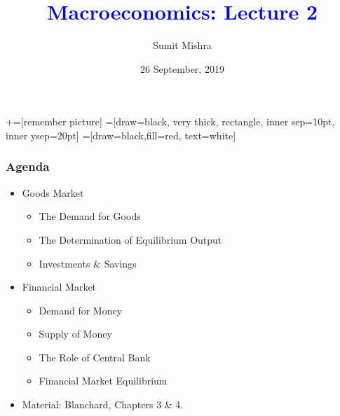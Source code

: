 \documentclass[shownotes,11pt, aspectratio=169]{beamer}
\title[]{\textcolor{blue}{Macroeconomics: Lecture 2}}
\author[SM]{Sumit Mishra}
\institute[IFMR]{\small{\begin{tabular}{c}
IFMR, Sri City \\
\end{tabular}}}
\date{26 September, 2019}
\begin{document}
\newcommand\marktopleft[1]{%
    \tikz[overlay,remember picture] 
        \node (marker-#1-a) at (-.3em,.3em) {};%
}
\newcommand\markbottomright[2]{%
    \tikz[overlay,remember picture] 
        \node (marker-#1-b) at (0em,0em) {};%
}
+=[remember picture] 
 =[draw=black, very thick, rectangle, inner sep=10pt, inner ysep=20pt]
 =[draw=black,fill=red, text=white]

\begin{frame}
\maketitle
\end{frame}

\begin{frame}
\frametitle{Agenda}
\begin{itemize}
 \item Goods Market
         \begin{itemize}
         \item The Demand for Goods
         \item The Determination of Equilibrium Output
         \item Investments \& Savings
         \end{itemize}
\item Financial Market
          \begin{itemize}
           \item Demand for Money
           \item Supply of Money
           \item The Role of Central Bank
           \item Financial Market Equilibrium
           \end{itemize}
\item Material: Blanchard, Chapters 3 \& 4.
\end{itemize}
\end{frame}

\end{document}
